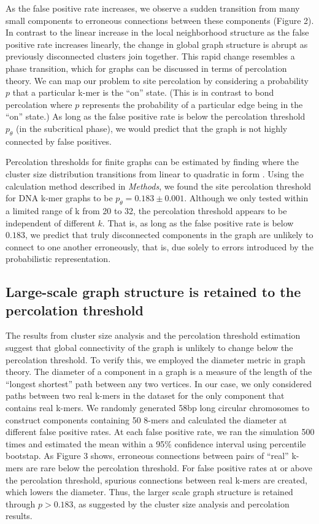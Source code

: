 \documentclass[12pt]{article} \usepackage{simplemargins}
\begin{document}
As the false positive rate increases, we observe a sudden transition
from many small components to erroneous connections between these
components (Figure 2).  In contrast to the linear increase in the
local neighborhood structure as the false positive rate increases
linearly, the change in global graph structure is abrupt as previously
disconnected clusters join together.  This rapid change resembles a
phase transition, which for graphs can be discussed in terms of
percolation theory. We can map our problem to site percolation by
considering a probability $p$ that a particular k-mer is the ``on''
state. (This is in contrast to bond percolation where $p$ represents
the probability of a particular edge being in the ``on'' state.) As
long as the false positive rate is below the percolation threshold
$p_\theta$ (in the subcritical phase), we would predict that the graph
is not highly connected by false positives.


Percolation thresholds for finite graphs can be estimated by finding
where the cluster size distribution transitions from linear to
quadratic in form \cite{stauffer1979scaling}.  Using the calculation
method described in \emph{Methods}, we found the site percolation
threshold for DNA k-mer graphs to be $p_\theta = 0.183 \pm 0.001$.
Although we only tested within a limited range of k from 20 to 32, the
percolation threshold appears to be independent of different $k$.
That is, as long as the false positive rate is below $0.183$, we
predict that truly disconnected components in the graph are unlikely
to connect to one another erroneously, that is, due solely to errors
introduced by the probabilistic representation.

\subsection{Large-scale graph structure is retained to the percolation threshold}

The results from cluster size analysis and the percolation threshold
estimation suggest that global connectivity of the graph is unlikely
to change below the percolation threshold. To verify this, we employed
the diameter metric in graph theory.  The diameter of a component in a
graph is a measure of the length of the ``longest shortest'' path
between any two vertices\cite{bondy2008graph}.  In our case, we only
considered paths between two real k-mers in the dataset for the only
component that contains real k-mers.  We randomly generated 58bp long
circular chromosomes to construct components containing 50 8-mers and
calculated the diameter at different false positive rates. At each
false positive rate, we ran the simulation 500 times and estimated the
mean within a 95\% confidence interval using percentile bootstap. As 
Figure 3 shows, erroneous
connections between pairs of ``real'' k-mers are rare below the
percolation threshold. For false positive rates at or above the
percolation threshold, spurious connections between real k-mers are
created, which lowers the diameter.  Thus, the larger scale graph
structure is retained through $p > 0.183$, as suggested by the cluster
size analysis and percolation results.
\end{document}
